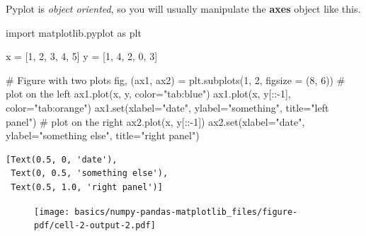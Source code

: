 \documentclass[
  letterpaper,
  DIV=11,
  numbers=noendperiod,
  oneside]{scrreprt}
\newenvironment{Shaded}{\begin{snugshade}}{\end{snugshade}}
\newcommand{\BuiltInTok}[1]{\textcolor[rgb]{0.00,0.23,0.31}{#1}}
\newcommand{\CommentTok}[1]{\textcolor[rgb]{0.37,0.37,0.37}{#1}}
\newcommand{\DecValTok}[1]{\textcolor[rgb]{0.68,0.00,0.00}{#1}}
\newcommand{\ImportTok}[1]{\textcolor[rgb]{0.00,0.46,0.62}{#1}}
\newcommand{\NormalTok}[1]{\textcolor[rgb]{0.00,0.23,0.31}{#1}}
\newcommand{\OperatorTok}[1]{\textcolor[rgb]{0.37,0.37,0.37}{#1}}
\newcommand{\StringTok}[1]{\textcolor[rgb]{0.13,0.47,0.30}{#1}}
\begin{document}
Pyplot is \emph{object oriented}, so you will usually manipulate the
\textbf{axes} object like this.

\begin{Shaded}
\begin{Highlighting}[]
\ImportTok{import}\NormalTok{ matplotlib.pyplot }\ImportTok{as}\NormalTok{ plt}

\NormalTok{x }\OperatorTok{=}\NormalTok{ [}\DecValTok{1}\NormalTok{, }\DecValTok{2}\NormalTok{, }\DecValTok{3}\NormalTok{, }\DecValTok{4}\NormalTok{, }\DecValTok{5}\NormalTok{]}
\NormalTok{y }\OperatorTok{=}\NormalTok{ [}\DecValTok{1}\NormalTok{, }\DecValTok{4}\NormalTok{, }\DecValTok{2}\NormalTok{, }\DecValTok{0}\NormalTok{, }\DecValTok{3}\NormalTok{]}

\CommentTok{\# Figure with two plots}
\NormalTok{fig, (ax1, ax2) }\OperatorTok{=}\NormalTok{ plt.subplots(}\DecValTok{1}\NormalTok{, }\DecValTok{2}\NormalTok{, figsize }\OperatorTok{=}\NormalTok{ (}\DecValTok{8}\NormalTok{, }\DecValTok{6}\NormalTok{))}
\CommentTok{\# plot on the left}
\NormalTok{ax1.plot(x, y, color}\OperatorTok{=}\StringTok{"tab:blue"}\NormalTok{)}
\NormalTok{ax1.plot(x, y[::}\OperatorTok{{-}}\DecValTok{1}\NormalTok{], color}\OperatorTok{=}\StringTok{"tab:orange"}\NormalTok{)}
\NormalTok{ax1.}\BuiltInTok{set}\NormalTok{(xlabel}\OperatorTok{=}\StringTok{"date"}\NormalTok{,}
\NormalTok{        ylabel}\OperatorTok{=}\StringTok{"something"}\NormalTok{,}
\NormalTok{        title}\OperatorTok{=}\StringTok{"left panel"}\NormalTok{)}
\CommentTok{\# plot on the right}
\NormalTok{ax2.plot(x, y[::}\OperatorTok{{-}}\DecValTok{1}\NormalTok{])}
\NormalTok{ax2.}\BuiltInTok{set}\NormalTok{(xlabel}\OperatorTok{=}\StringTok{"date"}\NormalTok{,}
\NormalTok{        ylabel}\OperatorTok{=}\StringTok{"something else"}\NormalTok{,}
\NormalTok{        title}\OperatorTok{=}\StringTok{"right panel"}\NormalTok{)}
\end{Highlighting}
\end{Shaded}

\begin{verbatim}
[Text(0.5, 0, 'date'),
 Text(0, 0.5, 'something else'),
 Text(0.5, 1.0, 'right panel')]
\end{verbatim}

\begin{figure}[H]

{\centering \texttt{[image: basics/numpy-pandas-matplotlib\_files/figure-pdf/cell-2-output-2.pdf]}

}

\end{figure}
\end{document}
